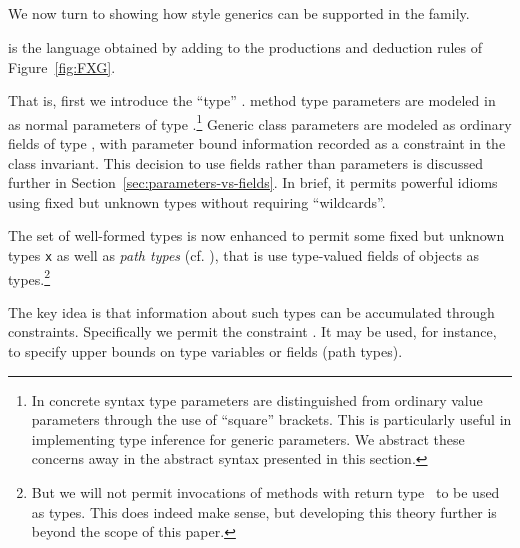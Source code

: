 \subsection{\FXG}
We now turn to showing how \FGJ{} style generics can be supported in the \FX{} family.

\FXG{} is the language obtained by adding to \FXZ{} the productions and deduction rules of Figure~\ref{fig:FXG}.

That is, first we introduce the ``type'' \type. \FGJ{} method type
parameters are modeled in \FXG{} as normal parameters of type
\type.\footnote{In concrete \Xten{} syntax type parameters are
distinguished from ordinary value parameters through the use of
``square'' brackets. This is particularly useful in implementing type
inference for generic parameters. We abstract these concerns away in
the abstract syntax presented in this section.}  Generic class
parameters are modeled as ordinary fields of type \type, with
parameter bound information recorded as a constraint in the class
invariant. This decision to use fields rather than parameters is
discussed further in Section~\ref{sec:parameters-vs-fields}. In brief,
it permits powerful idioms using fixed but unknown types without
requiring ``wildcards''.

The set of well-formed types is now enhanced to permit some fixed but unknown
types {\tt x} as well as \emph{path types} (cf. \cite{scala}), that is use type-valued fields of objects as types.\footnote{But we will not permit invocations of methods with return type \type\ to be 
used as types. This does indeed make sense, but developing
this theory further is beyond the scope of this paper.}

The key idea is that information about such types can
be accumulated through constraints.  Specifically we
permit the constraint . It may be used, for
instance, to specify upper bounds on type variables or fields (path
types).


